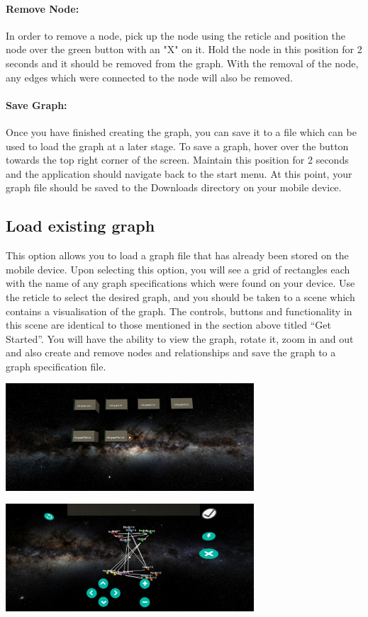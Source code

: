 \documentclass[english]{article}
\begin{document}
\paragraph{Remove Node: }
In order to remove a node, pick up the node using the reticle and position the node over the green button with an "X" on it. Hold the node in this position for 2 seconds and it should be removed from the graph. With the removal of the node, any edges which were connected to the node will also be removed.

\paragraph{Save Graph: }
Once you have finished creating the graph, you can save it to a file which can be used to load the graph at a later stage. To save a graph, hover over the button towards the top right corner of the screen. Maintain this position for 2 seconds and the application should navigate back to the start menu. At this point, your graph file should be saved to the Downloads directory on your mobile device.

\subsection{Load existing graph}
This option allows you to load a graph file that has already been stored on the mobile device. Upon selecting this option, you will see a grid of rectangles each with the name of any graph specifications which were found on your device. Use the reticle to select the desired graph, and you should be taken to a scene which contains a visualisation of the graph. The controls, buttons and functionality in this scene are identical to those mentioned in the section above titled “Get Started”. You will have the ability to view the graph, rotate it, zoom in and out and also create and remove nodes and relationships and save the graph to a graph specification file.

\includegraphics[width=350px]{Images/FileSelectorInterface.PNG}

\includegraphics[width=350px]{Images/LoadExistingGraphInterface.PNG}
\end{document}
